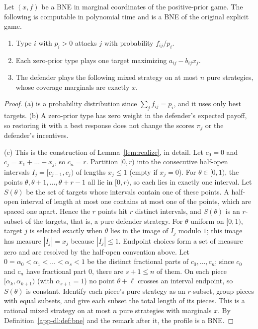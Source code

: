 \begin{lemma}[Decoder]\label{app-dl:lem:decode}
\statusrefereed
Let $(x,f)$ be a BNE in marginal coordinates of the positive-prior game. The following is computable in
polynomial time and is a BNE of the original explicit game.
\begin{enumerate}[label=(\alph*),nosep]
  \item Type $i$ with $p_i>0$ attacks $j$ with probability $f_{ij}/p_i$.
  \item Each zero-prior type plays one target maximizing $a_{ij}-b_{ij}x_j$.
  \item The defender plays the following mixed strategy on at most $n$ pure strategies, whose coverage
        marginals are exactly $x$.
\end{enumerate}
\end{lemma}

\begin{proof}
(a) is a probability distribution since $\sum_jf_{ij}=p_i$, and it uses only best targets. (b) A
zero-prior type has zero weight in the defender's expected payoff, so restoring it with a best response
does not change the scores $\pi_j$ or the defender's incentives.

(c) This is the construction of Lemma~\ref{lem:realize}, in detail. Let $c_0=0$ and $c_j=x_1+\dots+x_j$,
so $c_n=r$. Partition $[0,r)$ into the consecutive half-open intervals $I_j=[c_{j-1},c_j)$ of lengths
$x_j\le1$ (empty if $x_j=0$). For $\theta\in[0,1)$, the points $\theta,\theta+1,\dots,\theta+r-1$ all lie
in $[0,r)$, so each lies in exactly one interval. Let $S(\theta)$ be the set of targets whose intervals
contain one of these points. A half-open interval of length at most one contains at most one of the
points, which are spaced one apart. Hence the $r$ points hit $r$ distinct intervals, and $S(\theta)$ is an
$r$-subset of the targets, that is, a pure defender strategy. For $\theta$ uniform on $[0,1)$, target $j$
is selected exactly when $\theta$ lies in the image of $I_j$ modulo $1$; this image has measure
$|I_j|=x_j$ because $|I_j|\le1$. Endpoint choices form a set of measure zero and are resolved by the
half-open convention above. Let $0=\alpha_0<\alpha_1<\dots<\alpha_s<1$ be the distinct fractional parts of
$c_0,\dots,c_n$; since $c_0$ and $c_n$ have fractional part $0$, there are $s+1\le n$ of them. On each
piece $[\alpha_k,\alpha_{k+1})$ (with $\alpha_{s+1}=1$) no point $\theta+\ell$ crosses an interval
endpoint, so $S(\theta)$ is constant. Identify each piece's pure strategy as an $r$-subset, group pieces
with equal subsets, and give each subset the total length of its pieces. This is a rational mixed
strategy on at most $n$ pure strategies with marginals $x$. By Definition~\ref{app-dl:def:bne} and the
remark after it, the profile is a BNE.
\end{proof}

